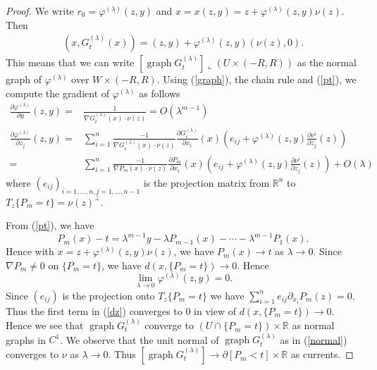 \documentclass[pdflatex,sn-mathphys-num]{sn-jnl}%
\theoremstyle{thmstyleone}%
\theoremstyle{thmstyletwo}%
\theoremstyle{thmstylethree}%
\newcommand{\vp}{\varphi}
\newcommand{\R}{\mathbb{R}}
\DeclareMathOperator{\graph}{graph}
\begin{document}
\begin{proof}
We write $r_0=\vp^{(\lambda)}(z,y)$ and $x=x(z,y)=z+\vp^{(\lambda)}(z,y)\nu(z)$. Then
\begin{align}\label{graph}
	(x,G_t^{(\lambda)}(x))=(z,y)+\vp^{(\lambda)}(z,y)(\nu(z),0).
\end{align}
This means that we can write $\left[\graph G_t^{(\lambda)}\right]\llcorner (U\times(-R,R))$ as the normal graph of $\vp^{(\lambda)}$ over $W \times (-R,R)$. Using (\ref{graph}), the chain rule and (\ref{pt}), we compute the gradient of $\vp^{(\lambda)}$ as follows 
\begin{align}
	\frac{\partial \vp^{(\lambda)}}{\partial y}(z,y)=&\frac{1}{\nabla G_t^{(\lambda)}(x)\cdot\nu(z)}=O(\lambda ^{m-1})\\
	\frac{\partial \vp^{(\lambda)}}{\partial z_j}(z,y)=&\sum_{i=1}^{n}\frac{-1}{\nabla G_t^{(\lambda)}(x)\cdot\nu(z)}\frac{\partial G_t^{(\lambda)}}{\partial x_i}(x)(e_{ij}+\vp^{(\lambda)}(z,y)\frac{\partial \nu^i}{\partial z_j}(z))\\
	=&\sum_{i=1}^{n}\frac{-1}{\nabla P_m(x)\cdot\nu(z)}\frac{\partial P_m}{\partial x_i}(x)(e_{ij}+\vp^{(\lambda)}(z,y)\frac{\partial \nu^i}{\partial z_j}(z))+O(\lambda)\label{dz}
\end{align}
where  $(e_{ij})_{i=1,\dots,n,j=1,\dots,n-1}$ is the projection matrix from $\R^n$ to $T_z\{P_m=t\}=\nu(z)^{\perp}$.

From (\ref{pt}), we have 
\begin{equation}\label{defining.vp}
	P_m(x)-t=\lambda^{m-1}y-\lambda P_{m-1}(x)-\cdots- \lambda^{m-1}P_1(x).
\end{equation} Hence  with $x=z+\vp^{(\lambda)}(z,y)\nu(z)$, we have $P_m(x)\to t$ as $\lambda\to0$. Since $\nabla P_m\neq0$ on $\{P_m=t\}$, we have $d(x,\{P_m=t\})\to 0$. Hence\[\lim_{\lambda\to 0}\vp^{(\lambda)}(z,y)= 0.\]
Since $(e_{ij})$ is the projection onto $T_z\{P_m=t\}$ we have $\sum_{i=1}^{n}e_{ij}\partial_{x_i}P_m(z)=0$. Thus the first term in (\ref{dz}) converges to 0 in view of $d(x,\{P_m=t\})\to 0$. Hence we see that $\graph G_t^{(\lambda)}$ converge to $(U\cap \{P_m=t\})\times\R$ as normal graphs in $C^1$. We observe that the unit normal of $\graph G_t^{(\lambda)}$ as in (\ref{normal}) converges to $\nu$ as $\lambda\to0$. Thus $\left[\graph G_t^{(\lambda)}\right]\to \partial[P_m<t]\times \R$ as currents.


\end{proof}
\end{document}
